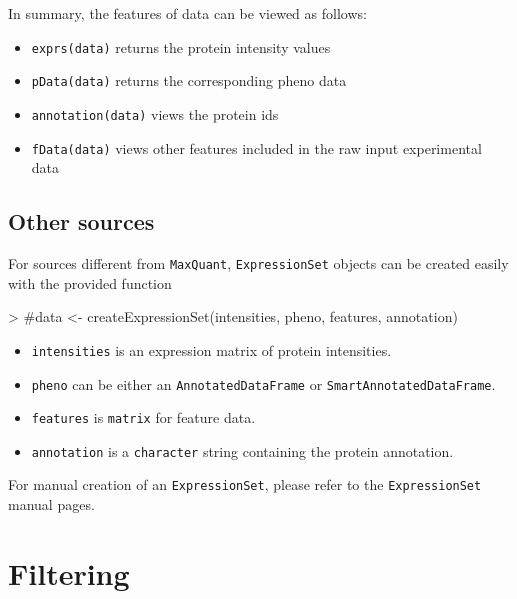 \documentclass[a4paper,11pt]{article}
\newcommand{\Robject}[1]{{\texttt{#1}}}
\newcommand{\Rfunction}[1]{{\texttt{#1}}}
\begin{document}
In summary, the features of data can be viewed as follows:
\begin{itemize}
   \item \Rfunction{exprs(data)} returns the protein intensity values 
   \item \Rfunction{pData(data)} returns the corresponding pheno data
   \item \Rfunction{annotation(data)} views the protein ids
   \item \Rfunction{fData(data)} views other features included in the raw input experimental data 
\end{itemize}


\subsection{Other sources}

For sources different from \texttt{MaxQuant}, \Robject{ExpressionSet} objects can be created easily with the provided function

\begin{Schunk}
\begin{Sinput}
> #data <- createExpressionSet(intensities, pheno, features, annotation)
\end{Sinput}
\end{Schunk}

\begin{itemize}
   \item \Robject{intensities} is an expression matrix of protein intensities.
   \item \Robject{pheno} can be either an \Robject{AnnotatedDataFrame} or \Robject{SmartAnnotatedDataFrame}.      
   \item \Robject{features} is \Robject{matrix} for feature data.
   \item \Robject{annotation} is a \Robject{character} string containing the protein annotation.
\end{itemize}
For manual creation of an \Robject{ExpressionSet}, please refer to the \Robject{ExpressionSet} manual pages.


\section{Filtering}
\label{sec:filtering}
\end{document}
